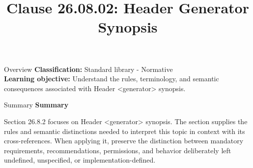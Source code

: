 \documentclass[10pt,letterpaper]{article}
\title{Clause 26.08.02: Header Generator Synopsis}
\author{}
\date{}
\begin{document}
\maketitle
\begin{CornellOverviewBox}{Overview}
\textbf{Classification:} Standard library - Normative\\[2pt]
\textbf{Learning objective:} Understand the rules, terminology, and semantic consequences associated with Header <generator> synopsis.
\end{CornellOverviewBox}\begin{CornellSummaryBox}{Summary}
{\sffamily\bfseries\color{Accent} Summary}\par\vspace{3pt}Section 26.8.2 focuses on Header <generator> synopsis. The section supplies the rules and semantic distinctions needed to interpret this topic in context with its cross-references. When applying it, preserve the distinction between mandatory requirements, recommendations, permissions, and behavior deliberately left undefined, unspecified, or implementation-defined.
\end{CornellSummaryBox}
\end{document}
